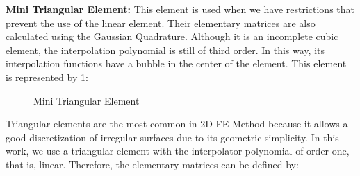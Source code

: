 \medskip
\noindent
\textbf{Mini Triangular Element:} 
This element is used when we have restrictions that 
prevent the use of the linear element. 
Their elementary matrices are also calculated using 
the Gaussian Quadrature. Although it is an incomplete cubic element, 
the interpolation polynomial is still of third order. 
In this way, its interpolation functions have a bubble in the center 
of the element. This element is represented by
\ref{elemento triangular mini}:

\begin{figure}[H]
\caption{Mini Triangular Element}
\begin{center}
\vspace{-0.5cm}
\end{center}
\vspace{-0.5cm}
\label{elemento triangular mini}
\end{figure}






\medskip
Triangular elements are the most common in 2D-FE Method because 
it allows a good discretization of irregular surfaces 
due to its geometric simplicity. In this work, we use a triangular 
element with the interpolator polynomial of order one, that is, linear.
Therefore, the elementary matrices can be defined by:


